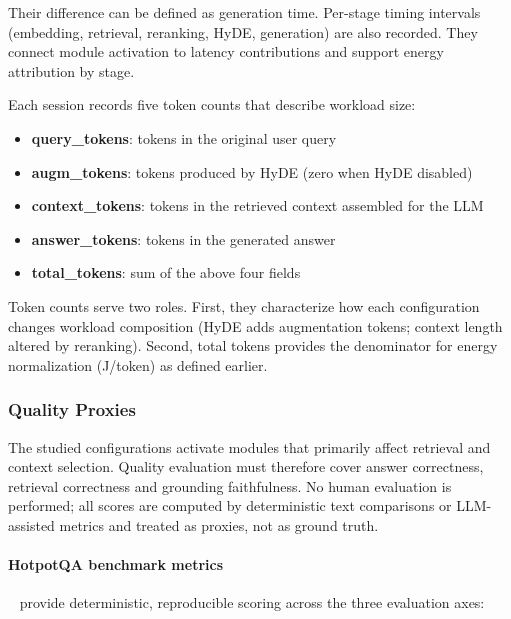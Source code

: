Their difference can be defined as generation time. Per-stage timing intervals (embedding, 
retrieval, reranking, HyDE, generation)
are also recorded. They connect module activation to latency contributions and
support energy attribution by stage. 


Each session records five token counts that describe workload size:
\begin{itemize}
    \item \textbf{query\_tokens}: tokens in the original user query
    \item \textbf{augm\_tokens}: tokens produced by HyDE (zero when HyDE
          disabled)
    \item \textbf{context\_tokens}: tokens in the retrieved context assembled
          for the LLM
    \item \textbf{answer\_tokens}: tokens in the generated answer
    \item \textbf{total\_tokens}: sum of the above four fields
\end{itemize}

Token counts serve two roles. First, they characterize how each configuration
changes workload composition (HyDE adds augmentation tokens; 
context length altered by reranking). 
Second, total tokens provides the denominator for energy
normalization (J/token) as defined earlier.


\subsubsection{Quality Proxies}
\label{subsubsec:quality-proxies}

The studied configurations activate modules that primarily affect retrieval
and context selection. Quality evaluation must therefore cover answer
correctness, retrieval correctness and grounding faithfulness.
No human evaluation is performed; all scores are computed by deterministic
text comparisons or LLM-assisted metrics and treated as proxies, not as
ground truth.


\paragraph{HotpotQA benchmark metrics}~\cite{hotpotqa2018} provide
deterministic, reproducible scoring across the three evaluation axes:

